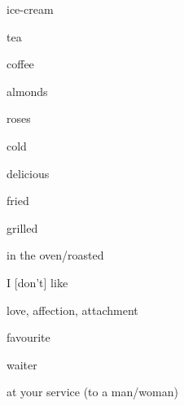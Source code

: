\begin{flashcard}{\LARGE ice-cream}
\LARGE {}
\end{flashcard}
\begin{flashcard}{\LARGE tea}
\LARGE {}
\end{flashcard}
\begin{flashcard}{\LARGE coffee}
\LARGE {}
\end{flashcard}
\begin{flashcard}{\LARGE almonds}
\LARGE {}
\end{flashcard}
\begin{flashcard}{\LARGE roses}
\LARGE {}
\end{flashcard}
\begin{flashcard}{\LARGE cold}
\LARGE {}
\end{flashcard}
\begin{flashcard}{\LARGE delicious}
\LARGE {}
\end{flashcard}
\begin{flashcard}{\LARGE fried}
\LARGE {}
\end{flashcard}
\begin{flashcard}{\LARGE grilled}
\LARGE {}
\end{flashcard}
\begin{flashcard}{\LARGE in the oven/roasted}
\LARGE {}
\end{flashcard}
\begin{flashcard}{\LARGE I {[}don't{]} like}
\LARGE {}
\end{flashcard}
\begin{flashcard}{\LARGE love, affection, attachment}
\LARGE {}
\end{flashcard}
\begin{flashcard}{\LARGE favourite}
\LARGE {}
\end{flashcard}
\begin{flashcard}{\LARGE waiter}
\LARGE {}
\end{flashcard}
\begin{flashcard}{\LARGE at your service (to a man/woman)}
\LARGE {}
\end{flashcard}
